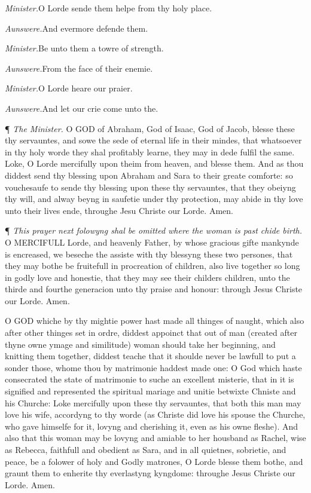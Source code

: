 \emph{Minister.}O Lorde sende them helpe from thy
holy place.

\emph{Aunswere.}And evermore defende them.

\emph{Minister.}Be unto them a towre of strength.

\emph{Aunswere.}From the face of their enemie.

\emph{Minister.}O Lorde heare our praier.

\emph{Aunswere.}And let our crie come unto the.

¶
\emph{The Minister.}
O
GOD of Abraham, God of Isaac, God of Jacob, blesse these thy servauntes,
and sowe the sede of eternal life in their mindes, that whatsoever in
thy holy worde they shal profitably learne, they may in dede fulfil the
same. Loke, O Lorde mercifully upon theim from heaven, and blesse them.
And as thou diddest send thy blessing upon Abraham and Sara to their greate
comforte: so vouchesaufe to sende thy blessing upon these thy servauntes,
that they obeiyng thy will, and alway beyng in saufetie under thy protection,
may abide in thy love unto their lives ende, throughe Jesu Christe our
Lorde. Amen.

¶
\emph{This prayer next folowyng shal be omitted where the woman is past chide
birth.}
O
MERCIFULL Lorde, and heavenly Father, by whose gracious gifte mankynde
is encreased, we beseche the assiste with thy blessyng these two persones,
that they may bothe be fruitefull in procreation of children, also live
together so long in godly love and honestie, that they may see their childers
children, unto the thirde and fourthe generacion unto thy praise and honour:
through Jesus Christe our Lorde. Amen.

O
GOD whiche by thy mightie power hast made all thinges of naught, which
also after other thinges set in ordre, diddest appoinct that out of man
(created after thyne owne ymage and similitude) woman should take her
beginning, and knitting them together, diddest teache that it shoulde
never be lawfull to put a sonder those, whome thou by matrimonie haddest
made one: O God which haste consecrated the state of matrimonie to suche
an excellent misterie, that in it is signified and represented the spiritual
mariage and unitie betwixte Chniste and his Churche: Loke mercifully upon
these thy servauntes, that both this man may love his wife, accordyng
to thy worde (as Christe did love his spouse the Churche, who gave himselfe
for it, lovyng and cherishing it, even as his owne fleshe). And also that
this woman may be lovyng and amiable to her housband as Rachel, wise as
Rebecca, faithfull and obedient as Sara, and in all quietnes, sobrietie,
and peace, be a folower of holy and Godly matrones, O Lorde blesse them
bothe, and graunt them to enherite thy everlastyng kyngdome: throughe
Jesus Christe our Lorde. Amen.

